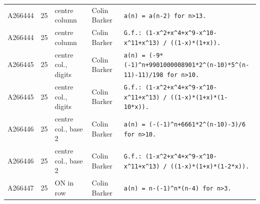 \documentclass[11pt]{article}
\theoremstyle{definition}
\theoremstyle{remark}
\begin{document}
{\begin{longtable}{p{1.3cm}p{0.7cm}p{2.4cm}p{2.3cm}p{7.3cm}}
A266444 & 25 & centre column & Colin Barker & \texttt{a(n)\allowbreak{} \allowbreak{}=\allowbreak{} \allowbreak{}a(n-\allowbreak{}2)\allowbreak{} \allowbreak{}for \allowbreak{}n>13.} \\
A266444 & 25 & centre column & Colin Barker & \texttt{G.f.: \allowbreak{}(1-\allowbreak{}x\^{}2+\allowbreak{}x\^{}4+\allowbreak{}x\^{}9-\allowbreak{}x\^{}10-\allowbreak{}x\^{}11+\allowbreak{}x\^{}13)\allowbreak{} \allowbreak{}/\allowbreak{} \allowbreak{}((1-\allowbreak{}x)\allowbreak{}*\allowbreak{}(1+\allowbreak{}x)\allowbreak{})\allowbreak{}.} \\
A266445 & 25 & centre col., digits & Colin Barker & \texttt{a(n)\allowbreak{} \allowbreak{}=\allowbreak{} \allowbreak{}(-\allowbreak{}9*\allowbreak{}(-\allowbreak{}1)\allowbreak{}\^{}n+\allowbreak{}9901000008901*\allowbreak{}2\^{}(n-\allowbreak{}10)\allowbreak{}*\allowbreak{}5\^{}(n-\allowbreak{}11)\allowbreak{}-\allowbreak{}11)\allowbreak{}/\allowbreak{}198 \allowbreak{}for \allowbreak{}n>10.} \\
A266445 & 25 & centre col., digits & Colin Barker & \texttt{G.f.: \allowbreak{}(1-\allowbreak{}x\^{}2+\allowbreak{}x\^{}4+\allowbreak{}x\^{}9-\allowbreak{}x\^{}10-\allowbreak{}x\^{}11+\allowbreak{}x\^{}13)\allowbreak{} \allowbreak{}/\allowbreak{} \allowbreak{}((1-\allowbreak{}x)\allowbreak{}*\allowbreak{}(1+\allowbreak{}x)\allowbreak{}*\allowbreak{}(1-\allowbreak{}10*\allowbreak{}x)\allowbreak{})\allowbreak{}.} \\
A266446 & 25 & centre col., base 2 & Colin Barker & \texttt{a(n)\allowbreak{} \allowbreak{}=\allowbreak{} \allowbreak{}(-\allowbreak{}(-\allowbreak{}1)\allowbreak{}\^{}n+\allowbreak{}6661*\allowbreak{}2\^{}(n-\allowbreak{}10)\allowbreak{}-\allowbreak{}3)\allowbreak{}/\allowbreak{}6 \allowbreak{}for \allowbreak{}n>10.} \\
A266446 & 25 & centre col., base 2 & Colin Barker & \texttt{G.f.: \allowbreak{}(1-\allowbreak{}x\^{}2+\allowbreak{}x\^{}4+\allowbreak{}x\^{}9-\allowbreak{}x\^{}10-\allowbreak{}x\^{}11+\allowbreak{}x\^{}13)\allowbreak{} \allowbreak{}/\allowbreak{} \allowbreak{}((1-\allowbreak{}x)\allowbreak{}*\allowbreak{}(1+\allowbreak{}x)\allowbreak{}*\allowbreak{}(1-\allowbreak{}2*\allowbreak{}x)\allowbreak{})\allowbreak{}.} \\
A266447 & 25 & ON in row & Colin Barker & \texttt{a(n)\allowbreak{} \allowbreak{}=\allowbreak{} \allowbreak{}n-\allowbreak{}(-\allowbreak{}1)\allowbreak{}\^{}n*\allowbreak{}(n-\allowbreak{}4)\allowbreak{} \allowbreak{}for \allowbreak{}n>3.} \\

\end{longtable}}
\end{document}
